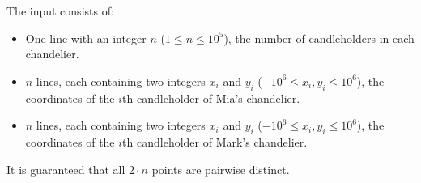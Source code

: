 
    The input consists of:
    \begin{itemize}
        \item One line with an integer $n$ ($1\leq n\leq 10^5$), the number of candleholders in each chandelier.
        \item $n$ lines, each containing two integers $x_i$ and $y_i$ ($-10^6 \leq x_i, y_i \leq 10^6$), the coordinates of the $i$th candleholder of Mia's chandelier.
        \item $n$ lines, each containing two integers $x_i$ and $y_i$ ($-10^6 \leq x_i, y_i \leq 10^6$), the coordinates of the $i$th candleholder of Mark's chandelier.
    \end{itemize}
    It is guaranteed that all $2 \cdot n$ points are pairwise distinct.
